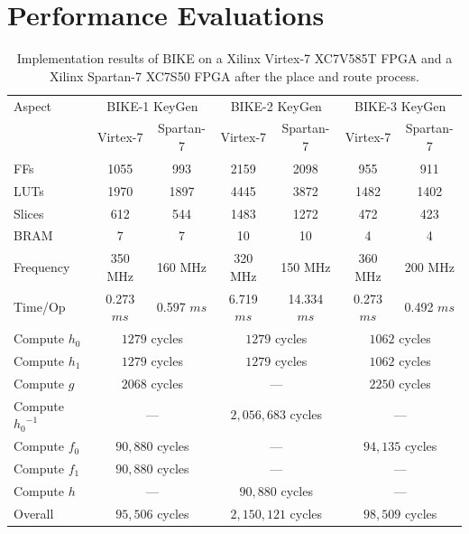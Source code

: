 \documentclass[runningheads]{llncs}
\begin{document}
\section{Performance Evaluations}
\begin{table}[!t]\centering
 \caption{Implementation results of BIKE on a Xilinx Virtex-7 XC7V585T FPGA and a Xilinx Spartan-7 XC7S50 FPGA after the place and route process.}
 \label{table:expresult}\centering
 \begin{minipage}{\textwidth}\centering
  \begin{tabular}{lcccccc}
   \hline
   Aspect & \multicolumn{2}{c}{BIKE-1 KeyGen} & \multicolumn{2}{c}{BIKE-2 KeyGen} & \multicolumn{2}{c}{BIKE-3 KeyGen}\\
    & Virtex-7 & Spartan-7  & Virtex-7 & Spartan-7  & Virtex-7 & Spartan-7\\
   \hline
   FFs &1055   &993  &2159 &2098 &955 &911\\
   LUTs & 1970  &1897  &4445 &3872&1482&1402  \\
   Slices& 612 &544  &1483 &1272&472&423  \\
   BRAM & 7  &7  &10 & 10& 4&4\\
   \hline
   Frequency &  350 MHz  & 160 MHz &320 MHz & 150 MHz  & 360 MHz & 200 MHz\\
   Time/Op &  0.273 $ms$ &  0.597 $ms$ & 6.719 $ms$& 14.334 $ms$ &0.273 $ms$  & 0.492 $ms$\\
   \hline
   Compute $h_0$ & \multicolumn{2}{c}{$1279$ cycles} & \multicolumn{2}{c}{$1279$ cycles}  & \multicolumn{2}{c}{$1062$ cycles}\\
   Compute $h_1$& \multicolumn{2}{c}{$1279$ cycles} & \multicolumn{2}{c}{$1279$ cycles} & \multicolumn{2}{c}{$1062$ cycles}\\
   Compute $g$ & \multicolumn{2}{c}{$2068$ cycles} & \multicolumn{2}{c}{---} & \multicolumn{2}{c}{$2250$ cycles}\\
   Compute ${h_0}^{-1}$ & \multicolumn{2}{c}{---} & \multicolumn{2}{c}{$2,056,683$ cycles} &\multicolumn{2}{c}{---}\\
   Compute $f_0$ & \multicolumn{2}{c}{$90,880$ cycles} & \multicolumn{2}{c}{---} &\multicolumn{2}{c}{$94,135$ cycles}\\
   Compute $f_1$ & \multicolumn{2}{c}{$90,880$ cycles}  & \multicolumn{2}{c}{---} &\multicolumn{2}{c}{---}\\
   Compute $h$  &  \multicolumn{2}{c}{---}          & \multicolumn{2}{c}{$90,880$ cycles} & \multicolumn{2}{c}{---}\\
   \hline
   Overall & \multicolumn{2}{c}{$95,506$ cycles} & \multicolumn{2}{c}{$2,150,121$ cycles} & \multicolumn{2}{c}{$98,509$ cycles}\\
   \hline
  \end{tabular}
  \end{minipage}
\end{table}
\end{document}
